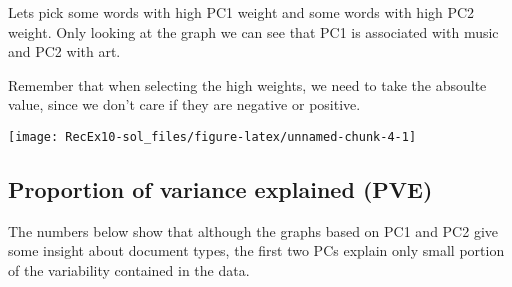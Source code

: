 \documentclass[
]{article}
\newenvironment{Shaded}{\begin{snugshade}}{\end{snugshade}}
\newcommand{\AttributeTok}[1]{\textcolor[rgb]{0.77,0.63,0.00}{#1}}
\newcommand{\ConstantTok}[1]{\textcolor[rgb]{0.00,0.00,0.00}{#1}}
\newcommand{\DecValTok}[1]{\textcolor[rgb]{0.00,0.00,0.81}{#1}}
\newcommand{\FunctionTok}[1]{\textcolor[rgb]{0.00,0.00,0.00}{#1}}
\newcommand{\NormalTok}[1]{#1}
\newcommand{\OtherTok}[1]{\textcolor[rgb]{0.56,0.35,0.01}{#1}}
\newcommand{\SpecialCharTok}[1]{\textcolor[rgb]{0.00,0.00,0.00}{#1}}
\begin{document}
Lets pick some words with high PC1 weight and some words with high PC2
weight. Only looking at the graph we can see that PC1 is associated with
music and PC2 with art.

Remember that when selecting the high weights, we need to take the
absoulte value, since we don't care if they are negative or positive.

\begin{Shaded}
\end{Shaded}

\begin{center}\texttt{[image: RecEx10-sol\_files/figure-latex/unnamed-chunk-4-1]} \end{center}

\hypertarget{proportion-of-variance-explained-pve}{%
\subsection{Proportion of variance explained
(PVE)}\label{proportion-of-variance-explained-pve}}

The numbers below show that although the graphs based on PC1 and PC2
give some insight about document types, the first two PCs explain only
small portion of the variability contained in the data.

\begin{Shaded}
\end{Shaded}
\end{document}
